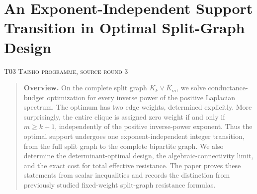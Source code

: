 \documentclass[11pt,a4paper]{article}
\theoremstyle{definition}\newtheorem{definition}[theorem]{Definition}
\theoremstyle{remark}\newtheorem{remark}[theorem]{Remark}
\numberwithin{equation}{section}
\begin{document}
\clearpage
\section[T03 --- An Exponent-Independent Support Transition in Optimal Split-Graph Design]{An Exponent-Independent Support Transition in Optimal Split-Graph Design}\label{contrib-T03}
\noindent\textsc{T03 \quad Taisho programme, source round 3}\par\medskip



\begin{quote}\small\textbf{Overview.} On the complete split graph $K_k\vee\overline K_m$, we solve conductance-budget optimization for every inverse power of the positive Laplacian spectrum. The optimum has two edge weights, determined explicitly. More surprisingly, the entire clique is assigned zero weight if and only if $m\ge k+1$, independently of the positive inverse-power exponent. Thus the optimal support undergoes one exponent-independent integer transition, from the full split graph to the complete bipartite graph. We also determine the determinant-optimal design, the algebraic-connectivity limit, and the exact cost for total effective resistance. The paper proves these statements from scalar inequalities and records the distinction from previously studied fixed-weight split-graph resistance formulas.\end{quote}
\end{document}
